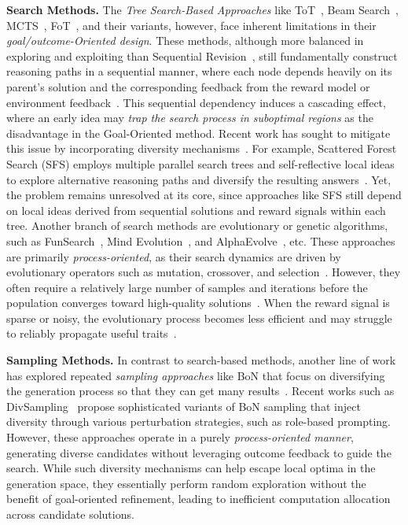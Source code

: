 \documentclass[11pt]{article}
\theoremstyle{definition}
\theoremstyle{remark}
\begin{document}
\textbf{Search Methods.} The \textit{Tree Search-Based Approaches} like ToT~\citep{yao2023tree}, Beam Search~\citep{Freitag_2017}, MCTS~\citep{MCTSGo}, FoT~\citep{bi2025forestofthought}, and their variants, however, face inherent limitations in their \textit{goal/outcome-Oriented design}. These methods, although more balanced in exploring and exploiting than Sequential Revision~\citep{snell2025scaling}, still fundamentally construct reasoning paths in a sequential manner, where each node depends heavily on its parent’s solution and the corresponding feedback from the reward model or environment feedback~\citep{yao2023tree, zhang2025aflow, light2025strategist, wu2025inference}. This sequential dependency induces a cascading effect, where an early idea may \textit{trap the search process in suboptimal regions} as the disadvantage in the Goal-Oriented method. Recent work has sought to mitigate this issue by incorporating diversity mechanisms~\citep{light2025sfs, bi2025forestofthought}. For example, Scattered Forest Search (SFS) employs multiple parallel search trees and self-reflective local ideas to explore alternative reasoning paths and diversify the resulting answers~\citep{light2025sfs}. Yet, the problem remains unresolved at its core, since approaches like SFS still depend on local ideas derived from sequential solutions and reward signals within each tree. Another branch of search methods are evolutionary or genetic algorithms, such as FunSearch~\citep{FunSearch2023}, Mind Evolution~\citep{lee2025evolvingdeeperllmthinking}, and AlphaEvolve~\citep{novikov2025alphaevolve}, etc. These approaches are primarily \textit{process-oriented}, as their search dynamics are driven by evolutionary operators such as mutation, crossover, and selection~\citep{gao2025survey}. However, they often require a relatively large number of samples and iterations before the population converges toward high-quality solutions~\citep{DeJong2016}. When the reward signal is sparse or noisy, the evolutionary process becomes less efficient and may struggle to reliably propagate useful traits~\citep{Eiben2015}.














\textbf{Sampling Methods.} In contrast to search-based methods, another line of work has explored repeated \textit{sampling approaches} like BoN that focus on diversifying the generation process so that they can get many results~\citep{li-etal-2023-making, wang2025diversified, Mu2024DDPromptDD}. Recent works such as DivSampling~\citep{wang2025diversified} propose sophisticated variants of BoN sampling that inject diversity through various perturbation strategies, such as role-based prompting. However, these approaches operate in a purely \textit{process-oriented manner}, generating diverse candidates without leveraging outcome feedback to guide the search. While such diversity mechanisms can help escape local optima in the generation space, they essentially perform random exploration without the benefit of goal-oriented refinement, leading to inefficient computation allocation across candidate solutions.
\end{document}
